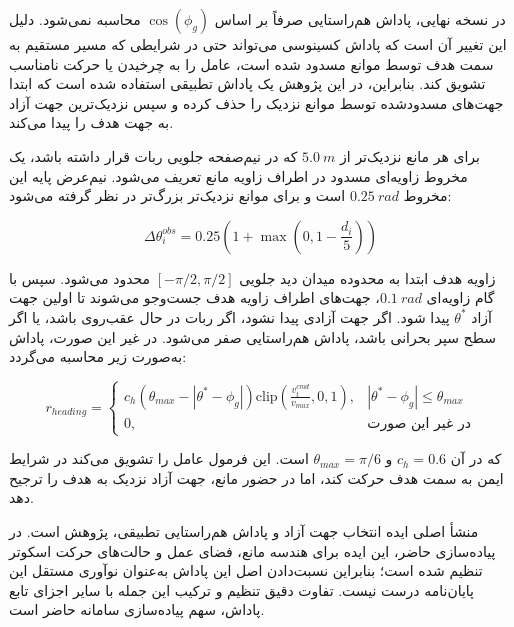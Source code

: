 در نسخه نهایی، پاداش هم‌راستایی صرفاً بر اساس \(\cos(\phi_g)\) محاسبه نمی‌شود. دلیل این تغییر آن است که پاداش کسینوسی می‌تواند حتی در شرایطی که مسیر مستقیم به سمت هدف توسط موانع مسدود شده است، عامل را به چرخیدن یا حرکت نامناسب تشویق کند. بنابراین، در این پژوهش یک پاداش تطبیقی استفاده شده است که ابتدا جهت‌های مسدودشده توسط موانع نزدیک را حذف کرده و سپس نزدیک‌ترین جهت آزاد به جهت هدف را پیدا می‌کند.

برای هر مانع نزدیک‌تر از \(5.0~m\) که در نیم‌صفحه جلویی ربات قرار داشته باشد، یک مخروط زاویه‌ای مسدود در اطراف زاویه مانع تعریف می‌شود. نیم‌عرض پایه این مخروط \(0.25~rad\) است و برای موانع نزدیک‌تر بزرگ‌تر در نظر گرفته می‌شود:

\begin{equation}
	\Delta\theta^{obs}_i
	=0.25\left(1+\max\left(0,1-\frac{d_i}{5}\right)\right)
	\label{eq:obstacle_blocking_cone_final}
\end{equation}

زاویه هدف ابتدا به محدوده میدان دید جلویی \([-\pi/2,\pi/2]\) محدود می‌شود. سپس با گام زاویه‌ای \(0.1~rad\)، جهت‌های اطراف زاویه هدف جست‌وجو می‌شوند تا اولین جهت آزاد \(\theta^*\) پیدا شود. اگر جهت آزادی پیدا نشود، اگر ربات در حال عقب‌روی باشد، یا اگر سطح سپر بحرانی باشد، پاداش هم‌راستایی صفر می‌شود. در غیر این صورت، پاداش به‌صورت زیر محاسبه می‌گردد:

\begin{equation}
	r_{heading}=
	\begin{cases}
		c_h\left(\theta_{max}-|\theta^*-\phi_g|\right)
		\mathrm{clip}\left(\frac{v^{cmd}_t}{v_{max}},0,1\right),
		& |\theta^*-\phi_g|\le\theta_{max}\\
		0, & \text{در غیر این صورت}
	\end{cases}
	\label{eq:adaptive_heading_reward_final}
\end{equation}

که در آن \(c_h=0.6\) و \(\theta_{max}=\pi/6\) است. این فرمول عامل را تشویق می‌کند در شرایط ایمن به سمت هدف حرکت کند، اما در حضور مانع، جهت آزاد نزدیک به هدف را ترجیح دهد.

منشأ اصلی ایده انتخاب جهت آزاد و پاداش هم‌راستایی تطبیقی، پژوهش \href{https://doi.org/10.1007/s44443-025-00357-z}{} است. در پیاده‌سازی حاضر، این ایده برای هندسه مانع، فضای عمل و حالت‌های حرکت اسکوتر تنظیم شده است؛ بنابراین نسبت‌دادن اصل این پاداش به‌عنوان نوآوری مستقل این پایان‌نامه درست نیست. تفاوت دقیق تنظیم و ترکیب این جمله با سایر اجزای تابع پاداش، سهم پیاده‌سازی سامانه حاضر است.

